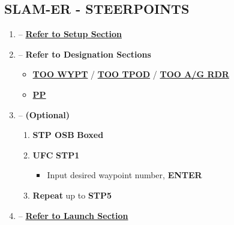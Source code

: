 \documentclass[fontInter]{TechCheck}
\begin{document}
	\subsection{SLAM-ER - STEERPOINTS}
	\label{subsec:slamersteerpoints}
	\begin{enumerate}[leftmargin=0.1\textwidth, rightmargin=0.1\textwidth, itemsep=4pt, label=\textbf{\arabic*.}]
		\item {} -- \hyperref[subsec:slamsetup]{\textbf{Refer to Setup Section}}
		\item {} -- \textbf{Refer to Designation Sections}
		\begin{itemize}
			\item \hyperref[subsec:slamdestoowypt]{\textbf{TOO WYPT}}
			/ \hyperref[subsec:slamdestootpod]{\textbf{TOO TPOD}}
			/ \hyperref[subsec:slamdestooag]{\textbf{TOO A/G RDR}}
			\item \hyperref[subsec:slamdespp]{\textbf{PP}}
		\end{itemize}
		\item {} -- \textbf{(Optional)} 
		\begin{enumerate}[itemsep=4pt]
			\item \textbf{STP OSB} \dotfill \textbf{Boxed}
			\item \textbf{UFC} \dotfill \textbf{STP1}
			\begin{itemize}
				\item Input desired waypoint number, \textbf{ENTER}
			\end{itemize}
			\item \textbf{Repeat} up to \textbf{STP5}
		\end{enumerate}
		\item {} -- \hyperref[subsec:slamlaunch]{\textbf{Refer to Launch Section}}
	\end{enumerate}


	\clearpage
\end{document}
